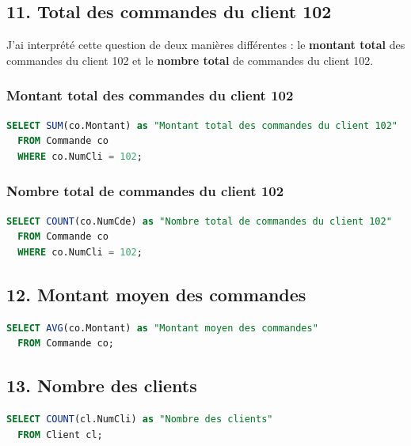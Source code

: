 \documentclass{article}
\begin{document}
\subsection*{11. Total des commandes du client 102}

J'ai interprété cette question de deux manières différentes : le \textbf{montant total} des commandes du client 102 et le \textbf{nombre total} de commandes du client 102.

\subsubsection{Montant total des commandes du client 102}

\begin{lstlisting}[language=SQL]
  SELECT SUM(co.Montant) as "Montant total des commandes du client 102"
  FROM Commande co
  WHERE co.NumCli = 102;
\end{lstlisting}

\subsubsection{Nombre total de commandes du client 102}

\begin{lstlisting}[language=SQL]
  SELECT COUNT(co.NumCde) as "Nombre total de commandes du client 102"
  FROM Commande co
  WHERE co.NumCli = 102;
\end{lstlisting}

\subsection*{12. Montant moyen des commandes}

\begin{lstlisting}[language=SQL]
  SELECT AVG(co.Montant) as "Montant moyen des commandes"
  FROM Commande co;
\end{lstlisting}

\subsection*{13. Nombre des clients}

\begin{lstlisting}[language=SQL]
  SELECT COUNT(cl.NumCli) as "Nombre des clients"
  FROM Client cl;
\end{lstlisting}
\end{document}
